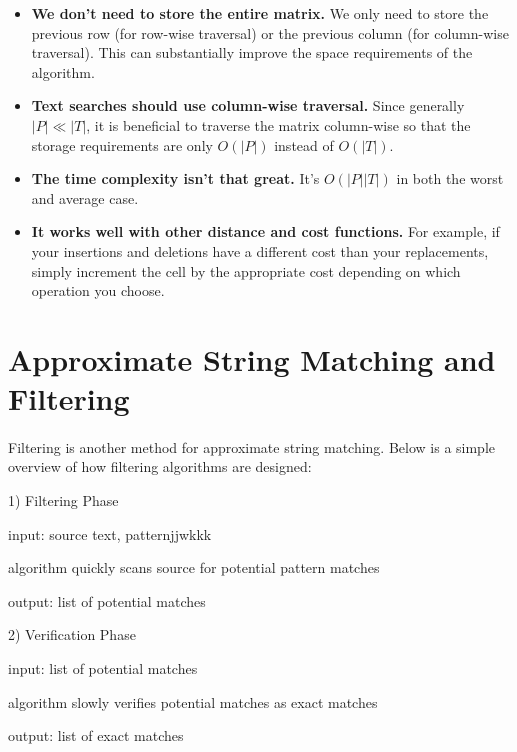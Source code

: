 \documentclass[10pt]{article}
\begin{document}
\begin{itemize}

\item \textbf{We don't need to store the entire matrix.} We only need to store
the previous row (for row-wise traversal) or the previous column (for column-wise
traversal). This can substantially improve the space requirements of the
algorithm.

\item \textbf{Text searches should use column-wise traversal.} Since generally
$|P| \ll |T|$, it is beneficial to traverse the matrix column-wise so that the
storage requirements are only $O(|P|)$ instead of $O(|T|)$.

\item \textbf{The time complexity isn't that great.} It's $O(|P||T|)$ in both
the worst and average case.

\item \textbf{It works well with other distance and cost functions.} For example,
if your insertions and deletions have a different cost than your replacements,
simply increment the cell by the appropriate cost depending on which operation
you choose.

\end{itemize}



\section*{Approximate String Matching and Filtering}

\paragraph{}Filtering is another method for approximate string matching. Below is a simple overview of how filtering algorithms are designed:

\begin{list}{}{}
\item 1) Filtering Phase
\begin{list}{*}{}
\item input: source text, patternjjwkkk
\item algorithm quickly scans source for potential pattern matches
\item output: list of potential matches
\end{list}
\item 2) Verification Phase
\begin{list}{*}{}
\item input: list of potential matches
\item algorithm slowly verifies potential matches as exact matches
\item output: list of exact matches
\end{list}
\end{list}
\end{document}
